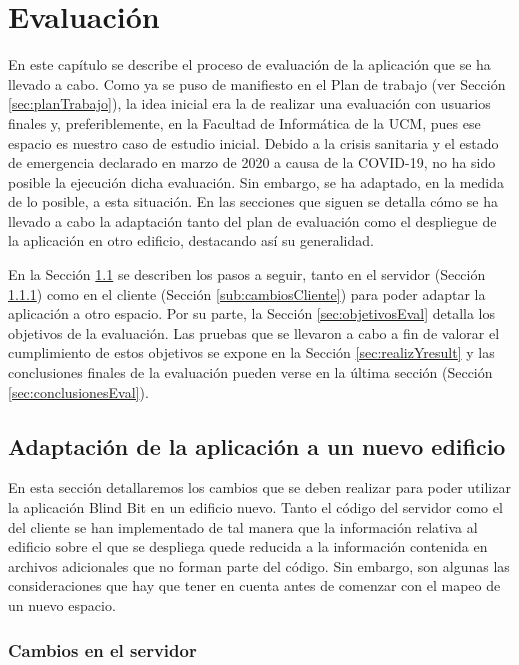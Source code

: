 \chapter{Evaluación}
\label{cap:evaluacion}

En este capítulo se describe el proceso de evaluación de la aplicación que se ha llevado a cabo. Como ya se puso de manifiesto en el Plan de trabajo (ver Sección \ref{sec:planTrabajo}), la idea inicial era la de realizar una evaluación con usuarios finales y, preferiblemente, en la Facultad de Informática de la UCM, pues ese espacio es nuestro caso de estudio inicial. Debido a la crisis sanitaria y el estado de emergencia declarado en marzo de 2020 a causa de la COVID-19, no ha sido posible la ejecución dicha evaluación. Sin embargo, se ha adaptado, en la medida de lo posible, a esta situación. En las secciones que siguen se detalla cómo se ha llevado a cabo la adaptación tanto del plan de evaluación como el despliegue de la aplicación en otro edificio, destacando así su generalidad. 

En la Sección \ref{sec:adaptacionApp} se describen los pasos a seguir, tanto en el servidor (Sección \ref{sub:cambiosServidor}) como en el cliente (Sección \ref{sub:cambiosCliente}) para poder adaptar la aplicación a otro espacio. Por su parte, la Sección \ref{sec:objetivosEval} detalla los objetivos de la evaluación. Las pruebas que se llevaron a cabo a fin de valorar el cumplimiento de estos objetivos se expone en la Sección \ref{sec:realizYresult} y las conclusiones finales de la evaluación pueden verse en la última sección (Sección \ref{sec:conclusionesEval}).


\section{Adaptación de la aplicación a un nuevo edificio}
\label{sec:adaptacionApp}

En esta sección detallaremos los cambios que se deben realizar para poder utilizar la aplicación Blind Bit en un edificio nuevo. Tanto el código del servidor como el del cliente se han implementado de tal manera que la información relativa al edificio sobre el que se despliega quede reducida a la información contenida en archivos adicionales que no forman parte del código. Sin embargo, son algunas las consideraciones que hay que tener en cuenta antes de comenzar con el mapeo de un nuevo espacio. 

\subsection{Cambios en el servidor}
\label{sub:cambiosServidor}

